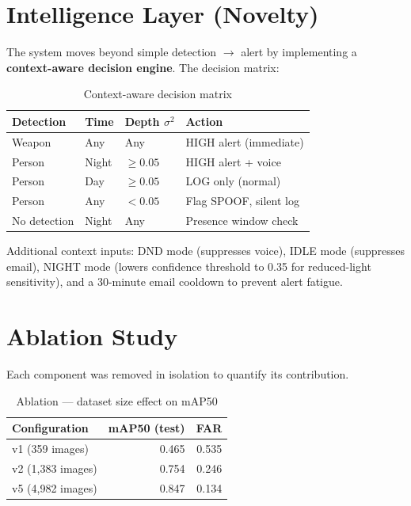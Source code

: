\documentclass[12pt,a4paper]{article}
\begin{document}
\section{Intelligence Layer (Novelty)}

The system moves beyond simple detection $\to$ alert by implementing a
\textbf{context-aware decision engine}. The decision matrix:

\begin{table}[h]
\centering
\caption{Context-aware decision matrix}
\begin{tabular}{@{}llll@{}}
\toprule
Detection     & Time     & Depth $\sigma^2$ & Action \\
\midrule
Weapon        & Any      & Any              & HIGH alert (immediate) \\
Person        & Night    & $\geq 0.05$      & HIGH alert + voice \\
Person        & Day      & $\geq 0.05$      & LOG only (normal) \\
Person        & Any      & $< 0.05$         & Flag SPOOF, silent log \\
No detection  & Night    & Any              & Presence window check \\
\bottomrule
\end{tabular}
\end{table}

Additional context inputs: DND mode (suppresses voice), IDLE mode (suppresses email),
NIGHT mode (lowers confidence threshold to 0.35 for reduced-light sensitivity),
and a 30-minute email cooldown to prevent alert fatigue.

\section{Ablation Study}

Each component was removed in isolation to quantify its contribution.

\begin{table}[h]
\centering
\caption{Ablation — dataset size effect on mAP50}
\begin{tabular}{@{}lrr@{}}
\toprule
Configuration         & mAP50 (test) & FAR   \\
\midrule
v1 (359 images)       & 0.465        & 0.535 \\
v2 (1{,}383 images)   & 0.754        & 0.246 \\
v5 (4{,}982 images)   & 0.847        & 0.134 \\
\bottomrule
\end{tabular}
\end{table}
\end{document}
